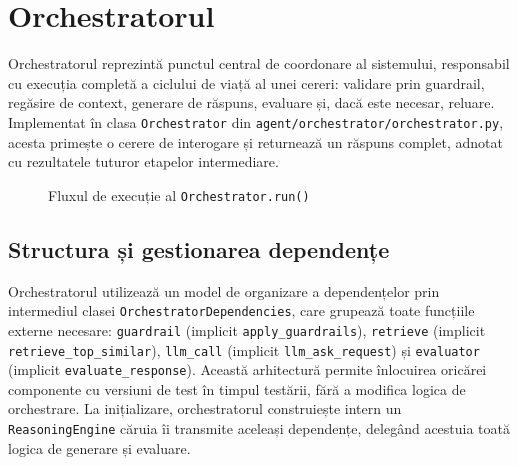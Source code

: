 \documentclass[12pt, a4paper, oneside, romanian]{teza-upb}
\begin{document}
\section{Orchestratorul}

Orchestratorul reprezintă punctul central de coordonare al sistemului, responsabil cu execuția completă a ciclului de viață al unei cereri: validare prin guardrail, regăsire de context, generare de răspuns, evaluare și, dacă este necesar, reluare. Implementat în clasa \texttt{Orchestrator} din \texttt{agent/orchestrator/orchestrator.py}, acesta primește o cerere de interogare și returnează un răspuns complet, adnotat cu rezultatele tuturor etapelor intermediare.

\begin{figure}[H]
\centering
{}
\caption{Fluxul de execuție al \texttt{Orchestrator.run()}}
\label{fig:orchestrator}
\end{figure}

\subsection{Structura și gestionarea dependențe}

Orchestratorul utilizează un model de organizare a dependențelor prin intermediul 
clasei \texttt{OrchestratorDependencies}, care grupează toate funcțiile externe necesare: \texttt{guardrail} (implicit \texttt{apply\_guardrails}), \texttt{retrieve} (implicit \texttt{retrieve\_top\_similar}), \texttt{llm\_call} (implicit \texttt{llm\_ask\_request}) și \texttt{evaluator} (implicit \texttt{evaluate\_response}). Această arhitectură permite înlocuirea oricărei componente cu versiuni de test în timpul testării, fără a modifica logica de orchestrare. La inițializare, orchestratorul construiește intern un \texttt{ReasoningEngine} căruia îi transmite aceleași dependențe, delegând acestuia toată logica de generare și evaluare.
\end{document}

